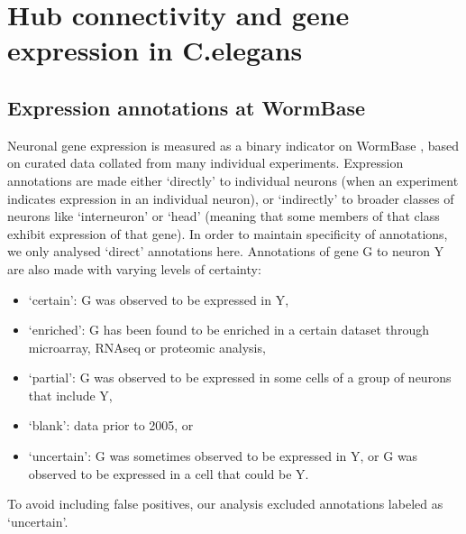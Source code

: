 \chapter{Hub connectivity and gene expression in C.elegans}


\section{Expression annotations at WormBase}
\label{app:AppendixCh2_1}

Neuronal gene expression is measured as a binary indicator on WormBase \citep{Harris2010}, based on curated data collated
from many individual experiments. Expression annotations are made either ‘directly’ to individual neurons (when
an experiment indicates expression in an individual neuron), or ‘indirectly’ to broader classes of neurons like
‘interneuron’ or ‘head’ (meaning that some members of that class exhibit expression of that gene). In order to
maintain specificity of annotations, we only analysed ‘direct' annotations here.
Annotations of gene G to neuron Y are also made with varying levels of certainty:
\begin{itemize}
\item ‘certain’: G was observed to be expressed in Y,
\item ‘enriched’: G has been found to be enriched in a certain dataset through microarray, RNAseq or
proteomic analysis,
\item ‘partial’: G was observed to be expressed in some cells of a group of neurons that include Y,
\item ‘blank’: data prior to 2005, or
\item ‘uncertain’: G was sometimes observed to be expressed in Y, or G was observed to be expressed in a cell
that could be Y.
\end{itemize}

To avoid including false positives, our analysis excluded annotations labeled as ‘uncertain’.

